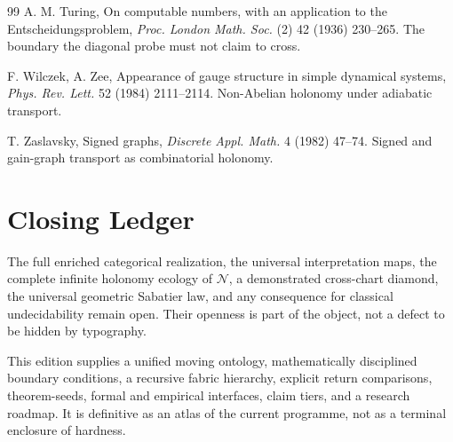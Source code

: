 \documentclass[12pt,openany]{book}
\theoremstyle{remark}
\newcommand{\Nfabric}{\mathcal N}
\begin{document}
\begin{thebibliography}{99}
 A. M. Turing, On computable numbers, with an application to the Entscheidungsproblem, \emph{Proc. London Math. Soc.} (2) 42 (1936) 230--265. The boundary the diagonal probe must not claim to cross.

 F. Wilczek, A. Zee, Appearance of gauge structure in simple dynamical systems, \emph{Phys. Rev. Lett.} 52 (1984) 2111--2114. Non-Abelian holonomy under adiabatic transport.

 T. Zaslavsky, Signed graphs, \emph{Discrete Appl. Math.} 4 (1982) 47--74. Signed and gain-graph transport as combinatorial holonomy.

\end{thebibliography}

\chapter*{Closing Ledger}

\begin{remainderbox}
The full enriched categorical realization, the universal interpretation maps, the complete infinite holonomy ecology of $\Nfabric$, a demonstrated cross-chart diamond, the universal geometric Sabatier law, and any consequence for classical undecidability remain open. Their openness is part of the object, not a defect to be hidden by typography.
\end{remainderbox}

\begin{claimbox}
This edition supplies a unified moving ontology, mathematically disciplined boundary conditions, a recursive fabric hierarchy, explicit return comparisons, theorem-seeds, formal and empirical interfaces, claim tiers, and a research roadmap. It is definitive as an atlas of the current programme, not as a terminal enclosure of hardness.
\end{claimbox}
\end{document}
